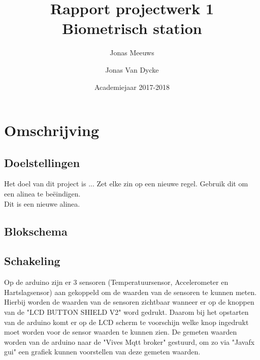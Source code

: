 \documentclass[a4paper]{report}
\title{Rapport projectwerk 1\\ Biometrisch station}
\author{Jonas Meeuws \and Jonas Van Dycke}
\date{Academiejaar 2017-2018}
\begin{document}
\maketitle
\tableofcontents

\chapter{Omschrijving}
\section{Doelstellingen}
Het doel van dit project is ...
Zet elke zin op een nieuwe regel.
Gebruik dit om een alinea te beëindigen.\\

Dit is een nieuwe alinea.

\section{Blokschema}

\section{Schakeling}
Op de arduino zijn er 3 sensoren (Temperatuursensor, Accelerometer en Hartslagsensor) aan gekoppeld om de waarden van de sensoren te kunnen meten.
Hierbij worden de waarden van de sensoren zichtbaar wanneer er op de knoppen van de "LCD BUTTON SHIELD V2" word gedrukt.
Daarom bij het opstarten van de arduino komt er op de LCD scherm te voorschijn welke knop ingedrukt moet worden voor de sensor waarden te kunnen zien.
De gemeten waarden worden van de arduino naar de "Vives Mqtt broker" gestuurd, om zo via "Javafx gui" een grafiek kunnen voorstellen van deze gemeten waarden.
\end{document}
